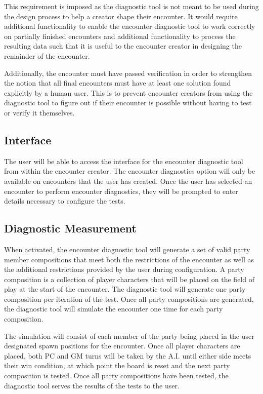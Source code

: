 \documentclass[12pt,a4paper]{report}
\begin{document}
		This requirement is imposed as the diagnostic tool is not meant to be used during the design process to help a creator shape their encounter. It would require additional functionality to enable the encounter diagnostic tool to work correctly on partially finished encounters and additional functionality to process the resulting data such that it is useful to the encounter creator in designing the remainder of the encounter. 
		
		Additionally, the encounter must have passed verification in order to strengthen the notion that all final encounters must have at least one solution found explicitly by a human user. This is to prevent encounter creators from using the diagnostic tool to figure out if their encounter is possible without having to test or verify it themselves. 
		\subsection{Interface}
		The user will be able to access the interface for the encounter diagnostic tool from within the encounter creator. The encounter diagnostics option will only be available on encounters that the user has created. Once the user has selected an encounter to perform encounter diagnostics, they will be prompted to enter details necessary to configure the tests. 
		
		\subsection{Diagnostic Measurement}
		When activated, the encounter diagnostic tool will generate a set of valid party member compositions that meet both the restrictions of the encounter as well as the additional restrictions provided by the user during configuration. A party composition is a collection of player characters that will be placed on the field of play at the start of the encounter. The diagnostic tool will generate one party composition per iteration of the test. Once all party compositions are generated, the diagnostic tool will simulate the encounter one time for each party composition. 
		
		The simulation will consist of each member of the party being placed in the user designated spawn positions for the encounter. Once all player characters are placed, both PC and GM turns will be taken by the A.I. until either side meets their win condition, at which point the board is reset and the next party composition is tested. Once all party compositions have been tested, the diagnostic tool serves the results of the tests to the user.
		
\end{document}
